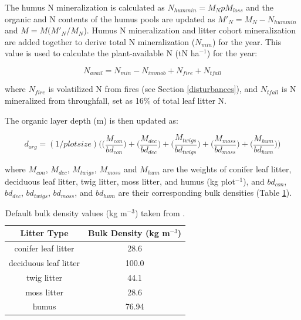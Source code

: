 \documentclass[a4paper, 12pt] {report}
\begin{document}
The humus N mineralization is calculated as $N_{hummin} = M_NpM_{loss}$ and the organic and N contents of the humus pools are updated as $M'_{N} = M_N - N_{hummin}$ and $M = M(M'_{N}/M_{N}$). Humus N mineralization and litter cohort mineralization are added together to derive total N mineralization ($N_{min}$) for the year. This value is used to calculate the plant-available N (tN ha$^{-1}$) for the year:

\begin{equation} 
N_{avail} = N_{min} - N_{immob} + N_{fire} + N_{tfall}
\end{equation}

where $N_{fire}$ is volatilized N from fires (see Section \ref{disturbances}), and $N_{tfall}$ is N mineralized from throughfall, set as 16\% of total leaf litter N.

The organic layer depth (m) is then updated as:

\begin{equation}
d_{org} = (1/plotsize)\Bigg(\Big(\frac{M_{con}}{bd_{con}}\Big) + \Big(\frac{M_{dec}}{bd_{dec}}\Big) + \Big(\frac{M_{twigs}}{bd_{twigs}}\Big) + \Big(\frac{M_{moss}}{bd_{moss}}\Big) + \Big(\frac{M_{hum}}{bd_{hum}}\Big)\Bigg)
\end{equation}

where $M_{con}$, $M_{dec}$, $M_{twigs}$, $M_{moss}$ and $M_{hum}$ are the weights of conifer leaf litter, deciduous leaf litter, twig litter, moss litter, and humus (kg plot$^{-1}$), and $bd_{con}$, $bd_{dec}$, $bd_{twigs}$, $bd_{moss}$, and $bd_{hum}$ are their corresponding bulk densities (Table \ref{tab:bulkdens}).

\begin{table}
  \begin{center}
    \caption{Default bulk density values (kg m$^{-3}$) taken from  \protect{}.}
    \label{tab:bulkdens}
\begin{tabular}{c|c} 
      \textbf{Litter Type} & \textbf{Bulk Density (kg m$^{-3}$)}\\
      \hline
	conifer leaf litter & 28.6 \\
	deciduous leaf litter & 100.0 \\
	twig litter & 44.1 \\
	moss litter & 28.6 \\
	humus & 76.94 \\
    \end{tabular}
  \end{center}
\end{table}
\end{document}
